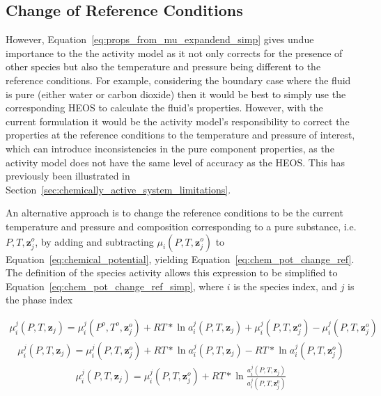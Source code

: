 \subsection{Change of Reference Conditions}
\label{sec:change_ref_cond}

    However, Equation~\ref{eq:props_from_mu_expandend_simp} gives undue importance to the the activity model as it not only corrects for the presence of other species but also the temperature and pressure being different to the reference conditions. For example, considering the boundary case where the fluid is pure (either water or carbon dioxide) then it would be best to simply use the corresponding \ac{HEOS} to calculate the fluid's properties. However, with the current formulation it would be the activity model's responsibility to correct the properties at the reference conditions to the temperature and pressure of interest, which can introduce inconsistencies in the pure component properties, as the activity model does not have the same level of accuracy as the \ac{HEOS}. This has previously been illustrated in Section~\ref{sec:chemically_active_system_limitations}.

    An alternative approach is to change the reference conditions to be the current temperature and pressure and composition corresponding to a pure substance, i.e. \(P, T, \mathbf{z}_j^o\), by adding and subtracting \(\mu_i (P, T, \mathbf{z}_j^o)\) to Equation~\ref{eq:chemical_potential}, yielding Equation~\ref{eq:chem_pot_change_ref}. The definition of the species activity allows this expression to be simplified to Equation~\ref{eq:chem_pot_change_ref_simp}, where \(i\) is the species index, and \(j\) is the phase index

    \begin{align}
        \mu_i^{j} (P, T, \mathbf{z}_j) = \mu_i^{j} (P^o, T^o, \mathbf{z}_j^o) +RT*\ln a_i^{j} (P, T, \mathbf{z}_j) + \mu_i^{j} (P, T, \mathbf{z}_j^o) - \mu_i^{j} (P, T, \mathbf{z}_j^o) \label{eq:chem_pot_change_ref}
    \end{align}
    \begin{align}
        \mu_i^{j} (P, T, \mathbf{z}_j) = \mu_i^{j} (P, T, \mathbf{z}_j^o) + RT*\ln a_i^{j} (P, T, \mathbf{z}_j) -RT*\ln a_i^{j} (P, T, \mathbf{z}_j^o)
    \end{align}
    \begin{align}
        \mu_i^{j} (P, T, \mathbf{z}_j) = \mu_i^{j} (P, T, \mathbf{z}_j^o) + RT*\ln \frac{a_i^{j} (P, T, \mathbf{z}_j)}{a_i^{j} (P, T, \mathbf{z}_j^0)} \label{eq:chem_pot_change_ref_simp}
    \end{align}

